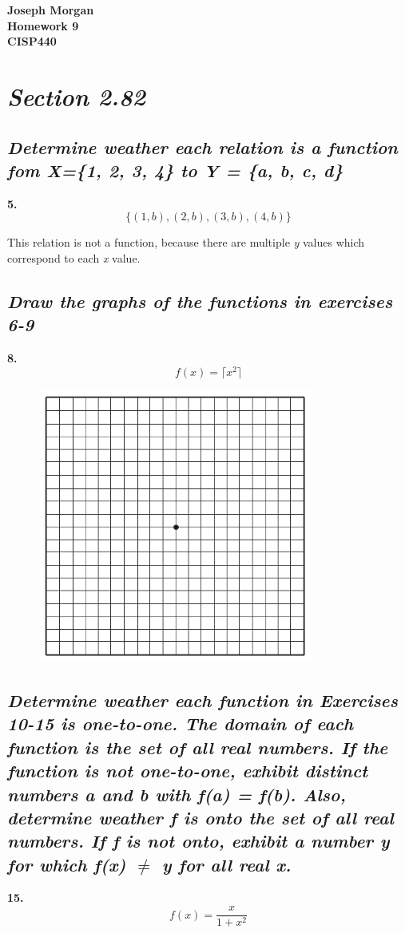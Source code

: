 \documentclass[12pt,titlepage]{article}
\begin{document}
\begin{titlepage}
	\centering
	\vfill
	{\bfseries\Large
		Joseph Morgan\\
		\large
		Homework 9\\
		\vskip2cm
		CISP440\\
	}
	\vfill
	\vfill
	\vfill
\end{titlepage}
\section*{\textit{Section 2.82}}
\subsection*{\textit{Determine weather each relation is a function fom X=\{1, 2, 3, 4\} to Y = \{a, b, c, d\}}}
\textbf{5.} 
\[\{(1, b), (2, b), (3, b), (4, b)\}\]

This relation is not a function, because there are multiple \textit{y} values which correspond to each \textit{x} value.
\subsection*{\textit{Draw the graphs of the functions in exercises 6-9}}
\textbf{8.} 
\[ f(x) = \lceil x^2 \rceil \]
\begin{figure}[ht!]
	\centering
	\includegraphics[width=90mm]{./grid.png}
\end{figure}
\subsection*{\textit{Determine weather each function in Exercises 10-15 is one-to-one.
		The domain of each function is the set of all real numbers. If the function is not
		one-to-one, exhibit distinct numbers a and b with f(a) = f(b). Also, determine
		weather f is onto the set of all real numbers. If f is not onto, exhibit a number y
		for which f(x) $\neq$ y for all real x.}}
\textbf{15.}
\[ f(x)=\frac{x}{1+x^2} \]
\end{document}
